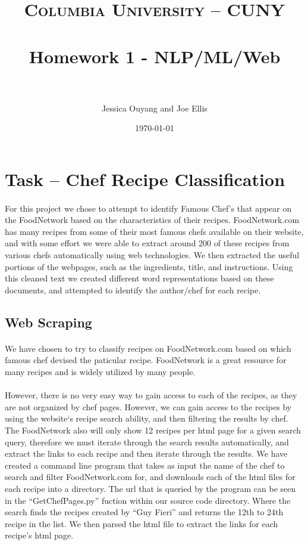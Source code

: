 \documentclass[paper=a4, fontsize=11pt]{scrartcl} %
\title{	
\normalfont \normalsize 
\textsc{Columbia University -- CUNY} \\ [25pt] %
\horrule{0.5pt} \\[0.4cm] %
\huge Homework 1 - NLP/ML/Web \\ %
\horrule{2pt} \\[0.5cm] %
}
\author{Jessica Ouyang and Joe Ellis} %
\date{\normalsize\today} %
\begin{document}
\maketitle %


\section{Task -- Chef Recipe Classification}
\paragraph{}
For this project we chose to attempt to identify Famous Chef's that appear on the FoodNetwork based on the characteristics of their recipes.
FoodNetwork.com has many recipes from some of their most famous chefs available on their website, and with some effort we were able to extract around 200 of these recipes from various chefs automatically using web technologies.  We then extracted the useful portions of the webpages, such as the ingredients, title, and instructions.  Using this cleaned text we created different word representations based on these documents, and attempted to identify the author/chef for each recipe.  


\subsection{Web Scraping}

\paragraph{}
We have chosen to try to classify recipes on FoodNetwork.com based on which famous chef devised the paticular recipe.  
FoodNetwork is a great resource for many recipes and is widely utilized by many people.

\paragraph{}
However, there is no very easy way to gain access to each of the recipes, as they are not organized by chef pages.  However, we can gain access to the recipes by using the website`s recipe search ability, and then filtering the results by chef.  The FoodNetwork also will only show 12 recipes per html page for a given search query, therefore we must iterate through the search results automatically, and extract the links to each recipe and then iterate through the results.  We have created a command line program that takes as input the name of the chef to search and filter FoodNetwork.com for, and downloads each of the html files for each recipe into a directory.  The url that is queried by the program can be seen in the ``GetChefPages.py'' fuction within our source code directory.  Where the search finds the recipes created by ``Guy Fieri'' and returns the 12th to 24th recipe in the list.  We then parsed the html file to extract the links for each recipe’s html page.
\end{document}
